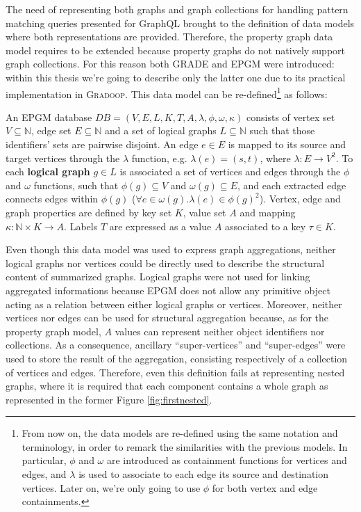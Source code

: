 \label{php:EPGM}
The need of representing both graphs and graph collections for handling pattern matching queries presented for GraphQL \cite{He2007} brought to the definition of data models where both representations are provided. Therefore, the property graph data model requires to be extended because property graphs do not natively support graph collections. For this reason both GRADE \cite{GRAD,Ghrab2015} and EPGM \cite{apacheflink,JunghannsPR17} were introduced: within this thesis we're going to describe only the latter one due to its practical implementation in \textsc{Gradoop}. This data model can be re-defined\footnote{From now on, the data models are re-defined using the same notation and terminology, in order to remark the similarities with the previous models. In particular, $\phi$ and $\omega$ are introduced as containment functions for vertices and edges, and $\lambda$ is used to associate to each edge its source and destination vertices. Later on, we're only going to use $\phi$ for both vertex and edge containments.} as follows:

\begin{definition}
	An EPGM database $DB = ( V, E, L, K, T, A,\lambda,\phi,\omega, \kappa )$ consists of vertex set $V\subseteq \mathbb{N}$, edge set $E\subseteq \mathbb{N}$ and a set of logical graphs $L\subseteq \mathbb{N}$ such that those identifiers' sets are  pairwise disjoint. An edge $e\in E$ is mapped to its source and target vertices through the $\lambda$ function, e.g. $\lambda(e) = ( s,t )$, where $\lambda\colon E\to V^2$.  To each \textbf{logical graph} $g \in L$ is  associated a set of vertices and edges through the $\phi$ and $\omega$ functions, such that $\phi(g)\subseteq V$ and $\omega(g)\subseteq E$, and each extracted edge connects edges within $\phi(g)$ ($\forall e\in \omega(g).\lambda(e)\in\phi(g)^2$). Vertex, edge and graph properties are defined by key set $K$, value set $A$ and mapping $\kappa : \mathbb{N} \times K \rightarrow A$. Labels $T$ are expressed as a value $A$ associated to a key $\tau\in K$.
\end{definition}

Even though this data model was  used to express graph aggregations,  neither logical graphs nor vertices could be directly used to describe the structural content of summarized graphs.  Logical graphs were not used for linking aggregated informations because EPGM does not allow any primitive object acting as a relation between either logical graphs or vertices. Moreover, neither vertices nor edges can be used for structural aggregation because, as for the property graph model, $A$ values can represent neither object identifiers nor collections. As a consequence, ancillary ``super-vertices'' and ``super-edges'' were used to store the result of the aggregation, consisting respectively of a collection of vertices and edges. Therefore, even this definition fails at representing nested graphs, where it is required that each component contains a whole graph as represented in the former Figure \vref{fig:firstnested}.